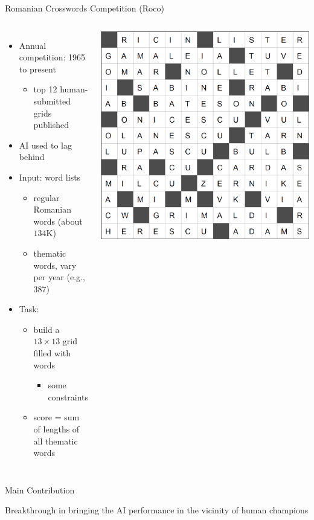 \documentclass[aspectratio=169,usenames,dvipsnames]{beamer}
\newcommand{\bei}{\begin{itemize}}
\newcommand{\eei}{\end{itemize}}
\newcommand{\ie}{\item}
\numberwithin{equation}{section}
\numberwithin{theorem}{section}
\numberwithin{lem}{section}
\numberwithin{df}{section}
\begin{document}
\begin{frame}{Romanian Crosswords Competition ({\sc Roco})}

\begin{columns}
\bei
\ie Annual competition: 1965 to present
\bei 
\ie top 12 human-submitted grids published
\eei
\ie AI used to lag behind

\bigskip

\ie Input: word lists
\bei
\ie regular Romanian words (about $134$K)
\ie thematic words, vary per year (e.g., $387$)
\eei

\bigskip

\ie Task:
\bei 
\ie build a $13\times13$ grid filled with words
\bei
\ie some constraints
\eei
\ie score = sum of lengths of all thematic words
\eei

\eei

\includegraphics[width=\columnwidth]{2013b.png}
\end{columns}
\end{frame}

\begin{frame}{Main Contribution}

Breakthrough in bringing the AI performance in the vicinity of human champions

\end{frame}
\end{document}
